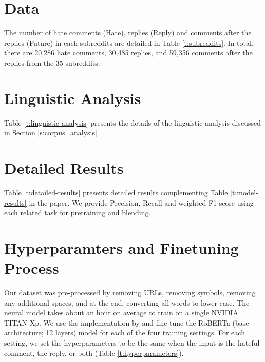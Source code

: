 \documentclass[11pt]{article}
\begin{document}
\section{Data}
\label{sec:appendix_data}
The number of hate comments (Hate), replies (Reply) and comments after the replies (Future) in each subreddits are detailed in Table \ref{t:subreddits}. 
In total, there are 20,286 hate comments, 30,485 replies, and 59,356 comments after the replies from the 35 subreddits.


\section{Linguistic Analysis}
\label{sec:appendix_ling}
Table \ref{t:linguistic-analysis} presents the details of the linguistic analysis discussed in Section \ref{s:corpus_analysis}.

\section{Detailed Results}
\label{sec:appendix_results}
Table \ref{t:detailed-results} presents detailed results complementing Table \ref{t:model-results} in the paper. 
We provide Precision, Recall and weighted F1-score using each related task for pretraining and blending.


\section{Hyperparamters and Finetuning Process}
\label{sec:appendix_hyper}

Our dataset was pre-processed by removing URLs, removing symbols, removing any additional spaces, and at the end, converting all words to lower-case. 
The neural model takes about an hour on average to train on a single NVIDIA TITAN Xp. 
We use the implementation by \citet{phang2020jiant} and fine-tune the RoBERTa (base architecture; 12 layers) \cite{DBLP:journals/corr/abs-1907-11692} model for each of the four training settings. 
For each setting, we set the hyperparameters to be the same when the input is the hateful comment, the reply, or both (Table \ref{t:hyperparameters}).
\end{document}
